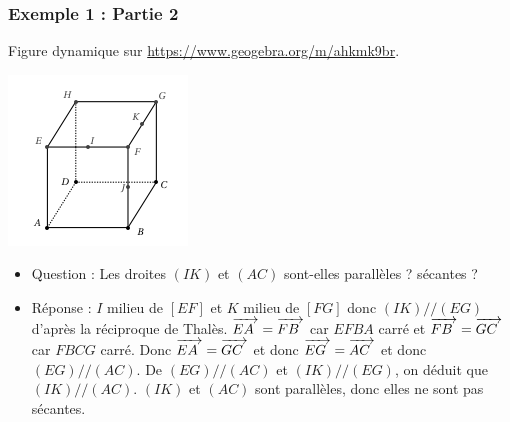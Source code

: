 \documentclass[xcolor=svgnames,t,final]{beamer}
\newcommand{\vect}[1]{\mathchoice%
{\overrightarrow{\displaystyle\mathstrut#1\,\,}}%
{\overrightarrow{\textstyle\mathstrut#1\,\,}}%
{\overrightarrow{\scriptstyle\mathstrut#1\,\,}}%
{\overrightarrow{\scriptscriptstyle\mathstrut#1\,\,}}}
\begin{document}
\begin{frame}

\frametitle{Exemple 1 : Partie 2}

Figure dynamique sur \href{https://www.geogebra.org/m/ahkmk9br}{https://www.geogebra.org/m/ahkmk9br}.


\begin{center}
\includegraphics[scale=0.4]{images/exemple1.png}
\end{center}

\begin{itemize}
\pause \item {\color{blue} Question : Les droites $(IK)$ et $(AC)$ sont-elles parallèles ? sécantes ? }
\pause \item {\color{red} Réponse : $I$ milieu de $[EF]$ et $K$ milieu de $[FG]$ donc $(IK)//(EG)$ d'après la réciproque de Thalès. $\vect{EA}=\vect{FB}$ car $EFBA$ carré et  $\vect{FB}=\vect{GC}$ car $FBCG$ carré. Donc $\vect{EA}= \vect{GC}$ et donc $\vect{EG}=\vect{AC}$ et donc $(EG)//(AC)$. De $(EG)//(AC)$ et $(IK)//(EG)$, on déduit que $(IK)//(AC)$. $(IK)$ et $(AC)$ sont parallèles, donc elles ne sont pas sécantes.}
\end{itemize}


\end{frame}
\end{document}
